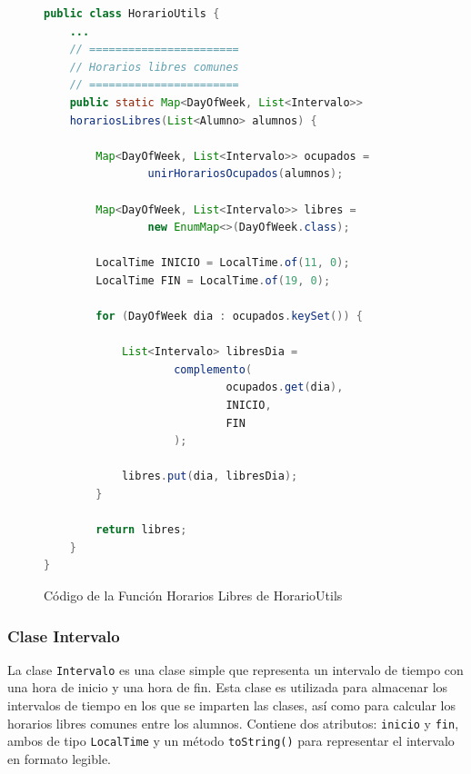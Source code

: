 \begin{figure}[H]
    \centering
    \begin{minipage}{0.9\textwidth}
    \caption{Código de la Función Horarios Libres de HorarioUtils}
    \label{code:HorarioUtils-HorariosLibresComunes}
    \vspace{-0.2cm}
    \begin{lstlisting}[language=Java, basicstyle=\scriptsize\ttfamily]
public class HorarioUtils {
    ...
    // =======================
    // Horarios libres comunes
    // =======================
    public static Map<DayOfWeek, List<Intervalo>>
    horariosLibres(List<Alumno> alumnos) {

        Map<DayOfWeek, List<Intervalo>> ocupados =
                unirHorariosOcupados(alumnos);

        Map<DayOfWeek, List<Intervalo>> libres =
                new EnumMap<>(DayOfWeek.class);

        LocalTime INICIO = LocalTime.of(11, 0);
        LocalTime FIN = LocalTime.of(19, 0);

        for (DayOfWeek dia : ocupados.keySet()) {

            List<Intervalo> libresDia =
                    complemento(
                            ocupados.get(dia),
                            INICIO,
                            FIN
                    );

            libres.put(dia, libresDia);
        }

        return libres;
    }
}
    \end{lstlisting}
    \end{minipage}
\end{figure}

\subsubsection{Clase Intervalo}
La clase \texttt{Intervalo} es una clase simple que representa un intervalo de tiempo con una hora de inicio y una hora de fin.
Esta clase es utilizada para almacenar los intervalos de tiempo en los que se imparten las clases, así como para calcular los horarios libres comunes entre los alumnos.
Contiene dos atributos: \texttt{inicio} y \texttt{fin}, ambos de tipo \texttt{LocalTime} y un método \texttt{toString()} para representar el intervalo en formato legible.

